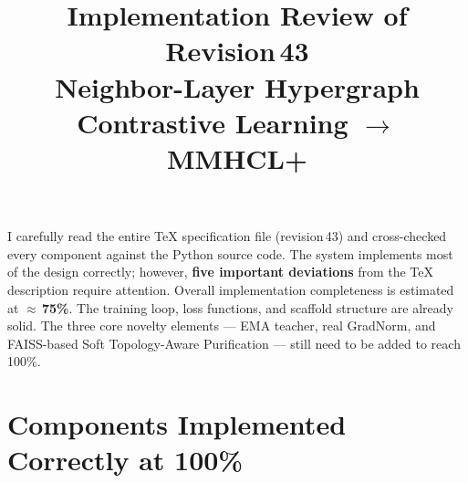 \documentclass[11pt,a4paper]{article}
\title{%
  \vspace{-0.8em}%
  {\Large\bfseries\color{NavyBlue} Implementation Review of Revision\,43}\\[0.5em]
  {\normalsize\color{gray}
    Neighbor-Layer Hypergraph Contrastive Learning $\longrightarrow$ MMHCL+}%
  \vspace{-0.5em}%
}
\author{}
\date{}
\begin{document}
\maketitle
\thispagestyle{fancy}
\vspace{-1.2em}

\begin{summarybox}
I carefully read the entire \TeX{} specification file (revision\,43) and cross-checked every component against the Python source code.
The system implements most of the design correctly; however, \textbf{five important deviations} from the \TeX{} description require attention.
Overall implementation completeness is estimated at \textbf{$\approx$\,75\%}.
The training loop, loss functions, and scaffold structure are already solid.
The three core novelty elements --- EMA teacher, real GradNorm, and FAISS-based Soft Topology-Aware Purification --- still need to be added to reach 100\%.
\end{summarybox}

\section{Components Implemented Correctly at 100\%}
\end{document}
